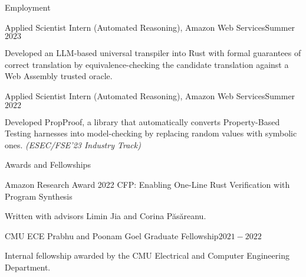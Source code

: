 \documentclass{resume} %
\begin{document}
\begin{rSection}{Employment}

  \begin{rSubsection}{Applied Scientist Intern (Automated Reasoning),
      Amazon Web Services}{Summer $2023$} {}{}
  \item Developed an LLM-based universal transpiler into Rust with
    formal guarantees of correct translation by equivalence-checking
    the candidate translation against a Web Assembly trusted oracle.
  \end{rSubsection}

  \begin{rSubsection}{Applied Scientist Intern (Automated Reasoning),
      Amazon Web Services}{Summer $2022$} {}{}
  \item Developed PropProof, a library that automatically converts
    Property-Based Testing harnesses into model-checking by replacing
    random values with symbolic ones. \textit{(ESEC/FSE'23 Industry Track)}
  \end{rSubsection}
\end{rSection}


\begin{rSection}{Awards and Fellowships}

  \begin{rSubsection}{Amazon Research Award 2022 CFP: Enabling One-Line Rust
      Verification with Program Synthesis}{}{}{}
  \item Written with advisors Limin Jia and Corina P\u{a}s\u{a}reanu.
  \end{rSubsection}

  \begin{rSubsection}{CMU ECE Prabhu and Poonam Goel Graduate
      Fellowship}{$2021 - 2022$}{}{}
  \item Internal fellowship awarded by the CMU Electrical and Computer
    Engineering Department.
  \end{rSubsection}
\end{rSection}
\end{document}
